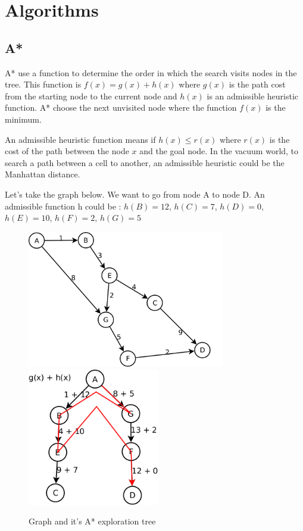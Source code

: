 \section{Algorithms}
  \subsection{A*}
A* use a function to determine the order in which the search visits nodes in the tree. This function is $f(x) = g(x) + h(x)$ where $g(x)$ is the path cost from the starting node to the current node and $h(x)$ is an admissible heuristic function. A* choose the next unvisited node where the function $f(x)$ is the minimum.
  
An admissible heuristic function means if $h(x) \leq r(x)$ where $r(x)$ is the cost of the path between the node $x$ and the goal node. In the vacuum world, to search a path between a cell to another, an admissible heuristic could be the Manhattan distance.

Let's take the graph below. We want to go from node A to node D. An admissible function h could be :
$h(B) = 12$,
$h(C) = 7$,
$h(D) = 0$,
$h(E) = 10$,
$h(F) = 2$,
$h(G) = 5$

\begin{figure}[!h]
  \centering
  \includegraphics[height=6cm]{img/AStar_exemple.png}
  \includegraphics[height=6cm]{img/AStar_tree.png}
  \caption{Graph and it's A* exploration tree}
  \label{BFS_Levels}
\end{figure} 

